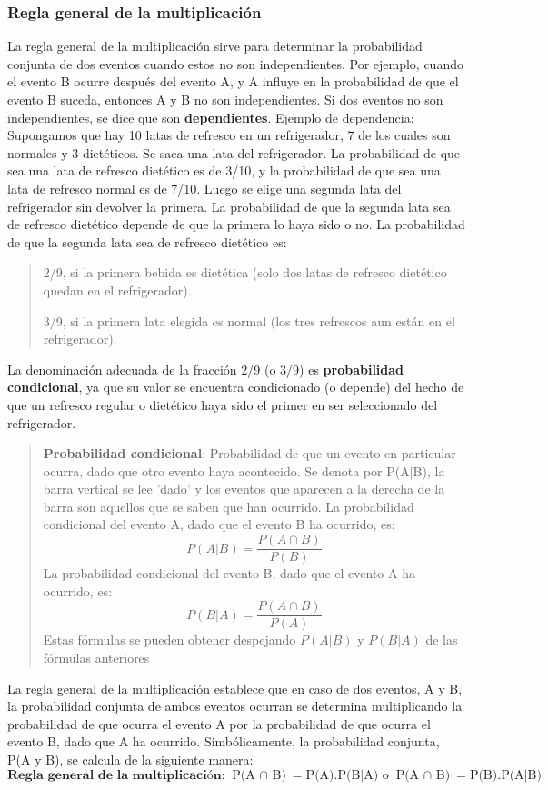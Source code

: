 \documentclass[]{article}
\begin{document}
\subsubsection*{Regla general de la multiplicación}
La regla general de la multiplicación sirve para determinar la probabilidad conjunta de dos eventos cuando estos no son independientes. Por ejemplo, cuando el evento B ocurre después del evento A, y A influye en la probabilidad de que el evento B suceda, entonces A y B no son independientes. Si dos eventos no son independientes, se dice que son \textbf{dependientes}. Ejemplo de dependencia: Supongamos que hay 10 latas de refresco en un refrigerador, 7 de los cuales son normales y 3 dietéticos. Se saca una lata del refrigerador. La probabilidad de que sea una lata de refresco dietético es de 3/10, y la probabilidad de que sea una lata de refresco normal es de 7/10. Luego se elige una segunda lata del refrigerador sin devolver la primera. La probabilidad de que la segunda lata sea de refresco dietético depende de que la primera lo haya sido o no. La probabilidad de que la segunda lata sea de refresco dietético es:
\begin{quote}
	2/9, si la primera bebida es dietética (solo dos latas de refresco dietético quedan en el refrigerador).
	\item 3/9, si la primera lata elegida es normal (los tres refrescos aun están en el refrigerador).
\end{quote}
La denominación adecuada de la fracción 2/9 (o 3/9) es \textbf{probabilidad condicional}, ya que su valor se encuentra condicionado (o depende) del hecho de que un refresco regular o dietético haya sido el primer en ser seleccionado del refrigerador.
\begin{quote}
	\textbf{Probabilidad condicional}: Probabilidad de que un evento en particular ocurra, dado que otro evento haya acontecido.
	Se denota por P(A$|$B), la barra vertical se lee 'dado' y los eventos que aparecen a la derecha de la barra son aquellos que se saben que han ocurrido. La probabilidad condicional del evento A, dado que el evento B ha ocurrido, es: 
	\[ P(A|B)  = \frac{P(A \cap B)}{P(B)}\]
	La probabilidad condicional del evento B, dado que el evento A ha ocurrido, es:
	\[ P(B|A)  = \frac{P(A \cap B)}{P(A)}\]	
Estas fórmulas se pueden obtener despejando $P(A|B)$ y $P(B|A)$ de las fórmulas anteriores
\end{quote}	
La regla general de la multiplicación establece que en caso de dos eventos, A y B, la probabilidad conjunta de ambos eventos ocurran se determina multiplicando la probabilidad de que ocurra el evento A por la probabilidad de que ocurra el evento B, dado que A ha ocurrido. Simbólicamente, la probabilidad conjunta, P(A y B), se calcula de la siguiente manera:
\[ \textbf{Regla general de la multiplicación: } \text{P(A $\cap$ B)} = \text{P(A)} .\text{P(B$|$A)} 
\text{ o } \text{P(A $\cap$ B)} = \text{P(B)} .\text{P(A$|$B)}
\]
\end{document}
